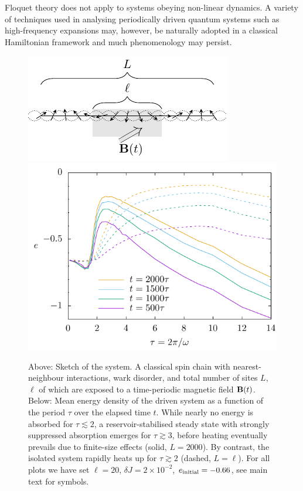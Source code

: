 \documentclass[prl,aps,twocolumn,notitlepage,10pt]{revtex4-1}
\begin{document}
Floquet theory does not apply to systems obeying non-linear dynamics.
A variety of techniques used in analysing periodically driven quantum systems
such as high-frequency expansions may, however, be naturally adopted in a
classical Hamiltonian framework \cite{Bukov-DAlessio-Polkovnikov-review} and
much phenomenology may persist.
\begin{figure}[h!]
  \includegraphics[width=0.8\linewidth]{figs/fig-1-sketch.pdf}
  \includegraphics[width=\linewidth]{figs/fig-1-heating.pdf}
  \caption{
    Above: Sketch of the system.
    A classical spin chain with nearest-neighbour interactions, wark disorder,
    and total number of sites $L$, $\ell$ of which are exposed to a time-periodic
    magnetic field ${\bf B}(t)$.
    Below: Mean energy density of the driven system as a function of the period
    $\tau$ over the elapsed time $t$.
    While nearly no energy is absorbed for $\tau \lesssim 2$, a
    reservoir-stabilised steady state with strongly suppressed absorption emerges
    for $\tau \gtrsim 3$, before heating eventually prevails due to finite-size
    effects (solid, $L=2000$). By contrast, the isolated system rapidly heats up
    for $\tau \gtrsim 2$ (dashed, $L= \ell$).
    For all plots we have set $\ell=20$, $\delta J = 2\times 10^{-2}$, $e_{\rm
    initial}=-0.66$, see main text for symbols.
  } \label{fig:reservoir-comparison}
\end{figure}
\end{document}
